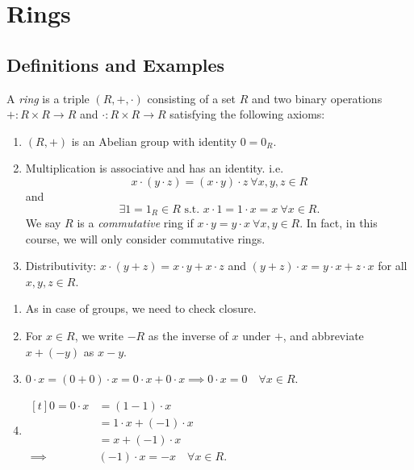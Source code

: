 \section{Rings}
\subsection{Definitions and Examples}
\leavevmode
\begin{definition}{}{}
    A \textit{ring} is a triple \((R, + , \cdot)\) consisting of a set \(R\) and two binary operations \(+: R \times R \to R\) and \(\cdot: R \times R \to R\) satisfying the following axioms:
    \begin{enumerate}
        \item \((R, +)\) is an Abelian group with identity \(0 = 0_R\).
        \item Multiplication is associative and has an identity. i.e.
        \[x\cdot(y\cdot z) = (x\cdot y)\cdot z~\forall x,y,z\in R\]
        and
        \[\exists 1=1_{R} \in R \text{ s.t. } x\cdot 1 = 1 \cdot x = x~\forall x\in R.\]
        We say \(R\) is a \textit{commutative} ring if \(x \cdot y = y \cdot x~\forall x,y \in R\). In fact, in this course, we will only consider commutative rings.
        \item Distributivity: \(x \cdot (y + z) = x \cdot y + x \cdot z\) and \((y + z)\cdot x = y \cdot x + z \cdot x\) for all \(x, y, z \in R\).
    \end{enumerate}
\end{definition}
\begin{remark}
    \leavevmode
    \begin{enumerate}
        \item As in case of groups, we need to check closure.
        \item For \(x\in R\), we write \(-R\) as the inverse of \(x\) under \(+\), and abbreviate \(x + (-y)\) as \(x - y\).
        \item \(0 \cdot x = (0 + 0)\cdot x = 0 \cdot x + 0 \cdot x \implies 0 \cdot x = 0\quad\forall x \in R\).
        \item \(\begin{aligned}[t]
            0 = 0\cdot x &= (1-1)\cdot x\\
            &= 1\cdot x + (-1)\cdot x\\
            &= x + (-1)\cdot x\\
            \implies& (-1)\cdot x = -x\quad \forall x \in R.
        \end{aligned}\) 
    \end{enumerate}
\end{remark}
